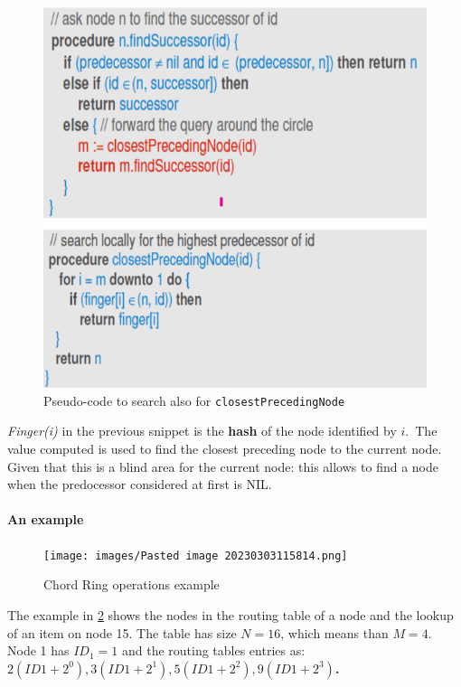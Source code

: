 \documentclass[10pt,a4paper]{report}
\begin{document}
\begin{figure}[h!]
	\centering
	\includegraphics[scale=0.40]{images/Pasted image 20230303121015.png}
	\caption{Pseudo-code to search also for \texttt{closestPrecedingNode}}
	\label{fig:findClosestAlg}

\end{figure}

\textit{Finger(i)} in the previous snippet is the \textbf{hash} of the node identified by $i$. The value computed is used to find the closest preceding node to the current node. Given that this is a blind area for the current node: this allows to find a node when the predocessor considered at first is NIL.
\paragraph{An example}\label{sec:an-example}
\begin{figure}[b!]
	\texttt{[image: images/Pasted image 20230303115814.png]}
	\caption{Chord Ring operations example}
	\label{dht-example}
\end{figure}

The example in \ref{dht-example} shows the nodes in the routing table of a node and the lookup of an item on node 15.
The table has size  $N=16$, which means than $M=4$.
Node 1 has $ID_{1}=1$ and the routing tables entries as: \textbf{$2(ID1+2^{0}),3(ID1+2^{1}),5(ID1+ 2^{2}),9(ID1+2^{3})$.}
\end{document}

